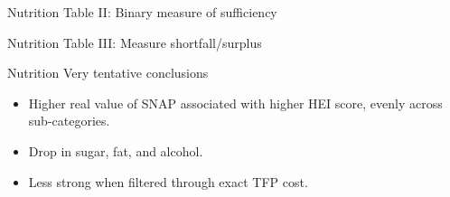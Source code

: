 \documentclass{beamer}
\begin{document}
\begin{frame}{Nutrition}
Table II: Binary measure of sufficiency
\end{frame}

\begin{frame}{Nutrition}
Table III: Measure shortfall/surplus
\end{frame}

\begin{frame}{Nutrition}
Very tentative conclusions
 
\begin{itemize}
\item Higher real value of SNAP associated with higher HEI score, evenly across sub-categories.
\item Drop in sugar, fat, and alcohol.
\item Less strong when filtered through exact TFP cost.
\end{itemize}
\end{frame}
\begin{frame}[plain]
\hspace{34mm}
\end{frame}
\end{document}

